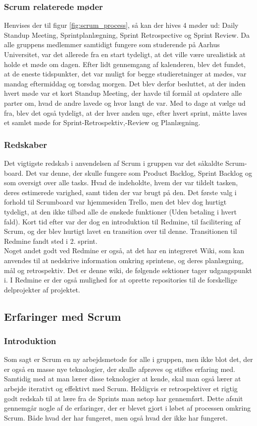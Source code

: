 \documentclass[a4paper,12pt,fleqn,oneside]{article}
\begin{document}
\subsubsection{Scrum relaterede møder}
Henvises der til figur \ref{fig:scrum_process}, så kan der hives 4 møder ud: Daily Standup Meeting, Sprintplanlægning, Sprint Retrospective og Sprint Review. Da alle gruppens medlemmer samtidigt fungere som studerende på Aarhus Universitet, var det allerede fra en start tydeligt, at det ville være urealistisk at holde et møde om dagen. Efter lidt gennemgang af kalenderen, blev det fundet, at de eneste tidspunkter, det var muligt for begge studieretninger at mødes, var mandag eftermiddag og torsdag morgen. Det blev derfor besluttet, at der inden hvert møde var et kort Standup Meeting, der havde til formål at opdatere alle parter om, hvad de andre lavede og hvor langt de var. Med to dage at vælge ud fra, blev det også tydeligt, at der hver anden uge, efter hvert sprint, måtte laves et samlet møde for Sprint-Retrospektiv,-Review og Planlægning. 

\subsubsection{Redskaber} \label{scrum_tools}
Det vigtigste redskab i anvendelsen af Scrum i gruppen var det såkaldte Scrum-board. Det var denne, der skulle fungere som Product Backlog, Sprint Backlog og som oversigt over alle tasks. Hvad de indeholdte, hvem der var tildelt tasken, deres estimerede varighed, samt tiden der var brugt på den. Det første valg i forhold til Scrumboard var hjemmesiden Trello, men det blev dog hurtigt tydeligt, at den ikke tilbød alle de ønskede funktioner (Uden betaling i hvert fald). Kort tid efter var der dog en introduktion til Redmine, til facilitering af Scrum, og der blev hurtigt lavet en transition over til denne. Transitionen til Redmine fandt sted i 2. sprint. 
\\Noget andet godt ved Redmine er også, at det har en integreret Wiki, som kan anvendes til at nedskrive information omkring sprintene, og deres planlægning, mål og retrospektiv. Det er denne wiki, de følgende sektioner tager udgangspunkt i. I Redmine er der også mulighed for at oprette repositories til de forskellige delprojekter af projektet.

\subsection{Erfaringer med Scrum}
\subsubsection{Introduktion}
Som sagt er Scrum en ny arbejdsmetode for alle i gruppen, men ikke blot det, der er også en masse nye teknologier, der skulle afprøves og stiftes erfaring med. Samtidig med at man lærer disse teknologier at kende, skal man også lærer at arbejde iterativt og effektivt med Scrum. Heldigvis er retrospektiver et rigtig godt redskab til at lære fra de Sprints man netop har gennemført. Dette afsnit gennemgår nogle af de erfaringer, der er blevet gjort i løbet af processen omkring Scrum. Både hvad der har fungeret, men også hvad der ikke har fungeret.
\end{document}
